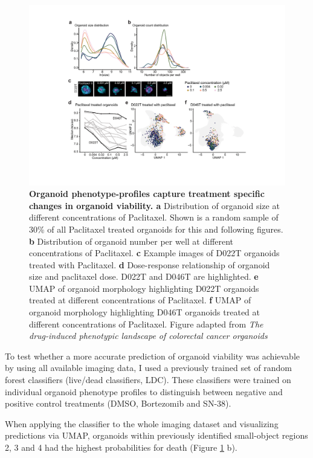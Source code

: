 \begin{flushleft}
\begin{figure}[H]
\centering
\includegraphics[width=\textwidth,
                height=\textheight,
                keepaspectratio]{figures/promise/pdf/fig_2_2.pdf}
\caption{\textbf{Organoid phenotype-profiles capture treatment specific changes in organoid viability. a} Distribution of organoid size at different concentrations of Paclitaxel. Shown is a random sample of 30\% of all Paclitaxel treated organoids for this and following figures. \textbf{b} Distribution of organoid number per well at different concentrations of Paclitaxel. \textbf{c} Example images of D022T organoids treated with Paclitaxel. \textbf{d} Dose-response relationship of organoid size and paclitaxel dose. D022T and D046T are highlighted. \textbf{e} UMAP of organoid morphology highlighting D022T organoids treated at different concentrations of Paclitaxel. \textbf{f} UMAP of organoid morphology highlighting D046T organoids treated at different concentrations of Paclitaxel. Figure adapted from \textit{The drug-induced phenotypic landscape of colorectal cancer organoids} \cite{Betge2022-kr}}
\label{fig_222}
\end{figure}
\bigbreak

To test whether a more accurate prediction of organoid viability was achievable by using all available imaging data, I used a previously trained set of random forest classifiers (live/dead classifiers, LDC). These classifiers were trained on individual organoid phenotype profiles to distinguish between negative and positive control treatments (DMSO, Bortezomib and SN-38). 

\bigbreak
When applying the classifier to the whole imaging dataset and visualizing predictions via UMAP, organoids within previously identified small-object regions 2, 3 and 4 had the highest probabilities for death (Figure \ref{fig_222} b). 


\end{flushleft}
